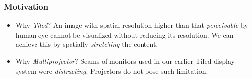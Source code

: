 \documentclass{beamer}
\begin{document}
\begin{frame}
\frametitle{Motivation}
\begin{itemize}
\item Why \textit{Tiled}?\newline
An image with spatial resolution higher than that \textit{perceivable} by human eye cannot be visualized without reducing its resolution. We can achieve this by spatially \textit{stretching} the content.
\item Why \textit{Multiprojector}?\newline
Seams of monitors used in our earlier Tiled display system were \textit{distracting}. Projectors do not pose such limitation.
\end{itemize}
\end{frame}


\end{document}
